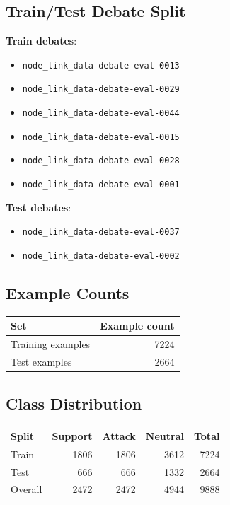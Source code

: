 \documentclass[11pt,a4paper]{article}
\begin{document}
\subsection{Train/Test Debate Split}
\textbf{Train debates}:
\begin{itemize}[leftmargin=1.5em]
  \item \texttt{node\_link\_data-debate-eval-0013}
  \item \texttt{node\_link\_data-debate-eval-0029}
  \item \texttt{node\_link\_data-debate-eval-0044}
  \item \texttt{node\_link\_data-debate-eval-0015}
  \item \texttt{node\_link\_data-debate-eval-0028}
  \item \texttt{node\_link\_data-debate-eval-0001}
\end{itemize}

\textbf{Test debates}:
\begin{itemize}[leftmargin=1.5em]
  \item \texttt{node\_link\_data-debate-eval-0037}
  \item \texttt{node\_link\_data-debate-eval-0002}
\end{itemize}

\subsection{Example Counts}
\begin{center}
\begin{tabular}{lr}
\toprule
Set & Example count \\
\midrule
Training examples & 7224 \\
Test examples & 2664 \\
\bottomrule
\end{tabular}
\end{center}

\subsection{Class Distribution}
\begin{center}
\begin{tabular}{lrrrr}
\toprule
Split & Support & Attack & Neutral & Total \\
\midrule
Train & 1806 & 1806 & 3612 & 7224 \\
Test & 666 & 666 & 1332 & 2664 \\
Overall & 2472 & 2472 & 4944 & 9888 \\
\bottomrule
\end{tabular}
\end{center}
\end{document}
